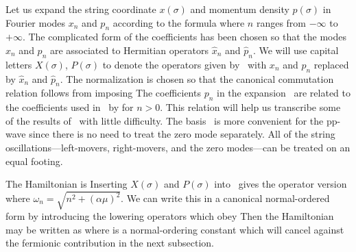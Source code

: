 Let us expand the string coordinate $x(\sigma)$ and momentum density
$p(\sigma)$ in Fourier modes $x_n$ and $p_n$ according to the formula
\eqn{}
where $n$ ranges from $-\infty$ to $+\infty$.
The complicated form of the coefficients has been chosen so that
the modes
$x_n$ and $p_n$ are associated to Hermitian operators
$\hat{x}_n$ and $\hat{p}_n$.
We will use capital letters $X(\sigma)$, $P(\sigma)$ to denote
the operators given by
\xandp\ with $x_n$ and $p_n$ replaced
by $\hat{x}_n$ and $\hat{p}_n$.
The normalization is chosen so that the canonical
commutation relation
\eqn{}
follows from imposing
\eqn{}
The coefficients $p_n$ in the expansion \xandp\ are related to the
coefficients used in \GSB\ by
\eqn{}
for $n>0$.  This relation will help us transcribe some of the
results of \GSB\ with little difficulty.
The basis \xandp\ is more convenient for the
pp-wave since there is no need
to treat the zero mode separately.
All of the string oscillations---left-movers, right-movers,
and the zero modes---can be treated on an equal footing.

The Hamiltonian is
\eqn{}
Inserting $X(\sigma)$ and $P(\sigma)$  into \hghd\ gives
the operator version
\eqn{}
where $\omega_n=\sqrt{n^2+(\alpha \mu)^2}.$
We can write this in a canonical normal-ordered form
by introducing
the lowering operators
\eqn{}
which obey
\eqn{}
Then the Hamiltonian may be written as
\eqn{}
where
\eqn{}
is a normal-ordering constant which will cancel against the fermionic
contribution in the next subsection.

